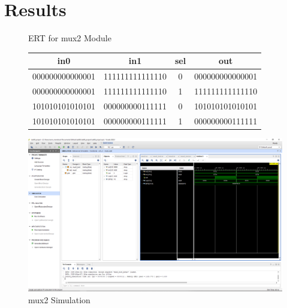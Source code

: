 \documentclass[11pt]{article}
\begin{document}
\section*{Results}

\begin{figure}[ht]\centering
		\caption{ERT for mux2 Module}
		\label{tbl:example_table}
		\begin{tabular}{ccc|c}
			\toprule
			in0 & in1 & sel & out \\
			\midrule
			000000000000001 & 111111111111110 & 0 & 000000000000001 \\
			000000000000001 & 111111111111110 & 1 & 111111111111110 \\
			101010101010101 & 000000000111111 & 0 & 101010101010101 \\
			101010101010101 & 000000000111111 & 1 & 000000000111111 \\
			\bottomrule
		\end{tabular} 
\includegraphics[width=1\textwidth,trim=19cm 15cm 0.5cm 4.5cm,clip]{mux2_test_screenshot}
	\caption{mux2 Simulation}
	\label{fig:sim_with_table}
\end{figure}

\FloatBarrier
\end{document}
